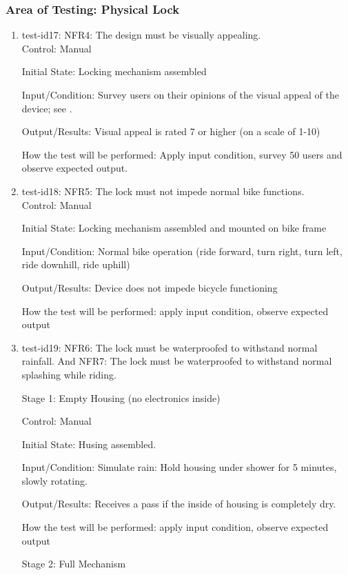 \documentclass[12pt, titlepage]{article}
\begin{document}
\subsubsection{Area of Testing: Physical Lock}
\begin{enumerate}

\item{test-id17: NFR4: The design must be visually appealing. \\}
Control: Manual 

Initial State: Locking mechanism assembled 

Input/Condition: Survey users on their opinions of the visual appeal of the device; see .

Output/Results: Visual appeal is rated 7 or higher (on a scale of 1-10) 

How the test will be performed: Apply input condition, survey 50 users and observe expected output.

\item{test-id18: NFR5: The lock must not impede normal bike functions. \\}
Control: Manual 

Initial State: Locking mechanism assembled and mounted on bike frame 

Input/Condition: Normal bike operation (ride forward, turn right, turn left, ride downhill, ride uphill) 

Output/Results: Device does not impede bicycle functioning 

How the test will be performed: apply input condition, observe expected output

\item{test-id19: NFR6: The lock must be waterproofed to withstand normal rainfall. And NFR7:  The lock must be waterproofed to withstand normal splashing while riding. \\}

Stage 1: Empty Housing (no electronics inside) 

Control: Manual 

Initial State: Husing assembled.

Input/Condition: Simulate rain: Hold housing under shower for 5 minutes, slowly rotating.

Output/Results: Receives a pass if the inside of housing is completely dry.

How the test will be performed: apply input condition, observe expected output

Stage 2: Full Mechanism 


\end{enumerate}
\end{document}

